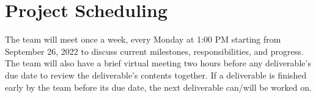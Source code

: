\documentclass{article}
\begin{document}
\section{Project Scheduling}

The team will meet once a week, every Monday at 1:00 PM starting from September 26, 2022 to discuss current milestones, responsibilities, and progress. The team will also have a brief virtual meeting two hours before any deliverable’s due date to review the deliverable’s contents together.
If a deliverable is finished early by the team before its due date, the next deliverable can/will be worked on.
\end{document}

